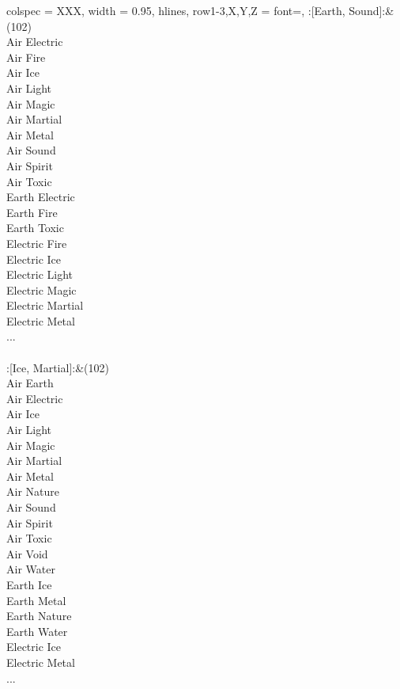 \begin{longtblr}[
	caption = {2v2 Defending Weak},
	label = {2v2-Defending-Weak},
]{
	colspec = {XXX}, width = 0.95\linewidth,
	hlines,
	row{1-3,X,Y,Z} = {font=\bfseries},
}
	:[Earth, Sound]:&{(102)\\
	Air Electric \\
	Air Fire \\
	Air Ice \\
	Air Light \\
	Air Magic \\
	Air Martial \\
	Air Metal \\
	Air Sound \\
	Air Spirit \\
	Air Toxic \\
	Earth Electric \\
	Earth Fire \\
	Earth Toxic \\
	Electric Fire \\
	Electric Ice \\
	Electric Light \\
	Electric Magic \\
	Electric Martial \\
	Electric Metal \\
	...\\
	}\\

	:[Ice, Martial]:&{(102)\\
	Air Earth \\
	Air Electric \\
	Air Ice \\
	Air Light \\
	Air Magic \\
	Air Martial \\
	Air Metal \\
	Air Nature \\
	Air Sound \\
	Air Spirit \\
	Air Toxic \\
	Air Void \\
	Air Water \\
	Earth Ice \\
	Earth Metal \\
	Earth Nature \\
	Earth Water \\
	Electric Ice \\
	Electric Metal \\
	...\\
	}\\


\end{longtblr}
